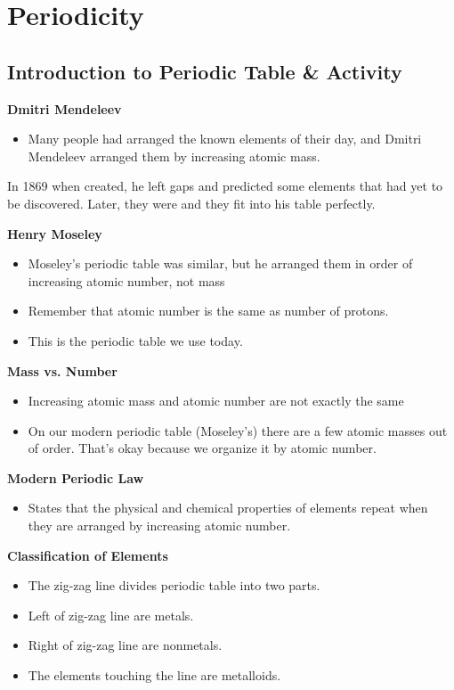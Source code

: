 \documentclass[../hchem.tex]{subfiles}
\begin{document}
\chapter{Periodicity}
\section{Introduction to Periodic Table \& Activity}
\textbf{Dmitri Mendeleev}
\begin{itemize}
    \item Many people had arranged the known elements of their day, and Dmitri Mendeleev arranged them by increasing atomic mass.
\end{itemize}
In 1869 when created, he left gaps and predicted some elements that had yet to be discovered. Later, they were and they fit into his table perfectly.

\textbf{Henry Moseley}
\begin{itemize}
    \item Moseley's periodic table was similar, but he arranged them in order of increasing atomic number, not mass 
    \item Remember that atomic number is the same as number of protons.
    \item This is the periodic table we use today.
\end{itemize}

\textbf{Mass vs. Number}
\begin{itemize}
    \item Increasing atomic mass and atomic number are not exactly the same 
    \item On our modern periodic table (Moseley's) there are a few atomic masses out of order. That's okay because we organize it by atomic number.
\end{itemize}

\textbf{Modern Periodic Law}
\begin{itemize}
    \item States that the physical and chemical properties of elements repeat when they are arranged by increasing atomic number.
\end{itemize}

\textbf{Classification of Elements}
\begin{itemize}
    \item The zig-zag line divides periodic table into two parts.
    \item Left of zig-zag line are metals.
    \item Right of zig-zag line are nonmetals.
    \item The elements touching the line are metalloids. 
\end{itemize}
\end{document}
